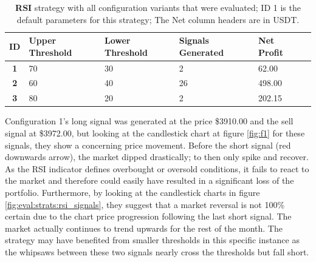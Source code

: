 \begin{table}[ht]
\centering
  \begin{tabularx}{\linewidth}{|c|L|L|L|L|L|} 
    \hline
    \textbf{ID} & \textbf{Upper Threshold} & \textbf{Lower Threshold} & \textbf{Signals Generated} & \textbf{Net Profit} \\
    \hline\hline
    \textbf{1} & 70 & 30 & 2 & 62.00 \\
    \hline
    \textbf{2} & 60 & 40 & 26 & 498.00 \\
    \hline
    \textbf{3} & 80 & 20 & 2 & 202.15 \\
    \hline
  \end{tabularx}
\caption{\textbf{RSI} strategy with all configuration variants that were evaluated; ID 1 is the default parameters for this strategy; The {Net} column headers are in USDT.}
\label{sec:evaluation:strats:rsi_allvariants}
\end{table}

Configuration 1's long signal was generated at the price \$3910.00 and the sell signal at \$3972.00, but looking at the candlestick chart at figure \ref{fig:f1} for these signals, they show a concerning price movement. Before the short signal (red downwards arrow), the market dipped drastically; to then only spike and recover.  As the RSI indicator defines overbought or oversold conditions, it fails to react to the market and therefore could easily have resulted in a significant loss of the portfolio. Furthermore, by looking at the candlestick charts in figure \ref{fig:eval:strats:rsi_signals}, they suggest that a market reversal is not 100\% certain due to the chart price progression following the last short signal. The market actually continues to trend upwards for the rest of the month. The strategy may have benefited from smaller thresholds in this specific instance as the whipsaws between these two signals nearly cross the thresholds but fall short.

